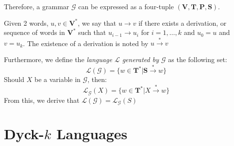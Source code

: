 Therefore, a grammar $\mathcal{G}$ can be expressed as a four-tuple $(\mathbf{V}, \mathbf{T}, \mathbf{P}, \mathbf{S})$. 

Given 2 words, $u, v \in \mathbf{V}^*$, we say that $u \rightarrow v$ if there exists a derivation, or sequence of words in $\mathbf{V}^*$ such that $u_{i-1} \rightarrow u_{i}$ for $i = 1,\dots,k$ and $u_0=u$ and $v=u_k$. The existence of a derivation is noted by $u \xrightarrow{*} v$

Furthermore, we define the \emph{language $\mathcal{L}$ generated by $\mathcal{G}$} as the following set:
$$
\mathcal{L}(\mathcal{G}) = \{w \in \mathbf{T}^* | \mathbf{S} \xrightarrow{*} w \}
$$
Should $X$ be a variable in $\mathcal{G}$, then:
$$
\mathcal{L}_{\mathcal{G}}(X) = \{ w \in \mathbf{T}^* | X \xrightarrow{*} w\}
$$
From this, we derive that $\mathcal{L}(\mathcal{G}) = \mathcal{L}_{\mathcal{G}}(S)$
\section{Dyck-$k$ Languages}